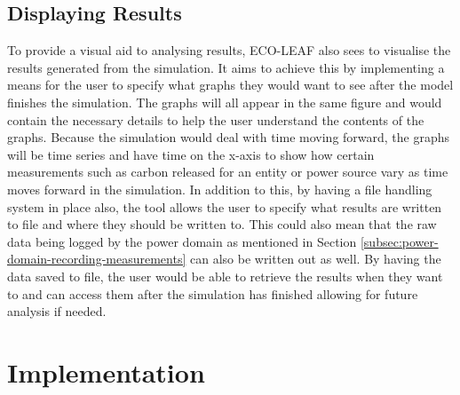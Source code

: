 \documentclass{l4proj}
\begin{document}
\section{Displaying Results}\label{sec:displaying results}
To provide a visual aid to analysing results, ECO-LEAF also sees to visualise the results generated from the simulation.
It aims to achieve this by implementing a means for the user to specify what graphs they would want to see after the model finishes the simulation.
The graphs will all appear in the same figure and would contain the necessary details to help the user understand the contents of the graphs.
Because the simulation would deal with time moving forward, the graphs will be time series and have time on the x-axis to show how certain measurements such as carbon released for an entity or power source vary as time moves forward in the simulation.
In addition to this, by having a file handling system in place also, the tool allows the user to specify what results are written to file and where they should be written to.
This could also mean that the raw data being logged by the power domain as mentioned in Section \ref{subsec:power-domain-recording-measurements} can also be written out as well.
By having the data saved to file, the user would be able to retrieve the results when they want to and can access them after the simulation has finished allowing for future analysis if needed.
\chapter{Implementation}\label{chp:imp}

\end{document}

